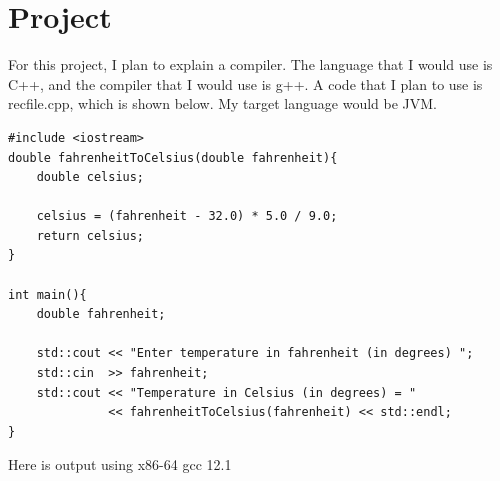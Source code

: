 \documentclass{article}
\theoremstyle{theorem}
\theoremstyle{definition}
\theoremstyle{remark}
\begin{document}
\section{Project}
For this project, I plan to explain a compiler. The language that I would use is C++, and the compiler that I would use is g++. A code that I plan to use is recfile.cpp, which is shown below. My target language would be JVM.
\begin{lstlisting}
#include <iostream>
double fahrenheitToCelsius(double fahrenheit){
    double celsius;
 
    celsius = (fahrenheit - 32.0) * 5.0 / 9.0;
    return celsius;
}
 
int main(){
    double fahrenheit;
 
    std::cout << "Enter temperature in fahrenheit (in degrees) ";
    std::cin  >> fahrenheit;
    std::cout << "Temperature in Celsius (in degrees) = "
              << fahrenheitToCelsius(fahrenheit) << std::endl;
}
\end{lstlisting}
Here is  output using x86-64 gcc 12.1
\end{document}

